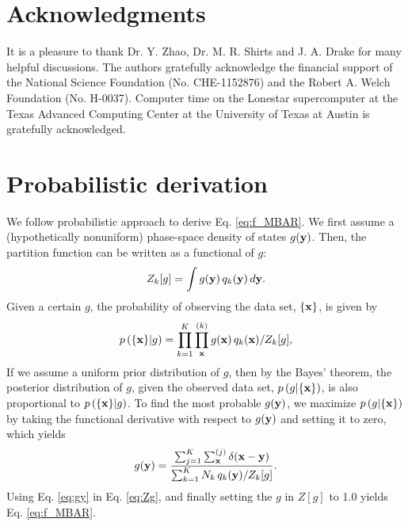 \documentclass[reprint,aip,jcp,superscriptaddress]{revtex4-1}
\begin{document}
\section{Acknowledgments}





It is a pleasure to thank
Dr. Y. Zhao, Dr. M. R. Shirts and J. A. Drake
for many helpful discussions.
%
The authors gratefully acknowledge
the financial support of
the National Science Foundation (No. CHE-1152876)
and
the Robert A. Welch Foundation (No. H-0037).
%
Computer time on the Lonestar supercomputer
at the Texas Advanced Computing Center
at the University of Texas at Austin
is gratefully acknowledged.




\appendix





\section{\label{sec:deriveMBAR}
Probabilistic derivation}



We follow probabilistic approach\cite{
bartels1997, *habeck2007, *habeck2012} to derive
Eq. \eqref{eq:f_MBAR}.
%
We first assume
a (hypothetically nonuniform)
phase-space density of states
$g(\mathbf{y})$.
%
Then, the partition function can be written
as a functional of $g$:
%
\begin{equation}
Z_k[g]
=
\int g(\mathbf{y}) \, q_k(\mathbf{y}) \, d\mathbf{y}.
\label{eq:Zg}
\end{equation}
%
Given a certain $g$,
the probability of observing the data set,
$\{ \mathbf{x} \}$,
is given by
%
\begin{equation*}
p\left( \{ \mathbf{x} \} | g \right)
=
\prod_{k = 1}^K
\prod_{\mathbf{x}}^{(k)}
g(\mathbf{x}) \, q_k(\mathbf{x}) / Z_k[g],
\end{equation*}
%
If we assume a uniform prior distribution of $g$,
then by the Bayes' theorem\cite{leonard},
the posterior distribution of $g$,
given the observed data set,
$p\left( g | \{ \mathbf{x} \} \right)$,
is also proportional to
$p\left( \{ \mathbf{x} \} | g \right)$.
%
To find the most probable $g(\mathbf{y})$,
we maximize
$p\left( g | \{ \mathbf{x} \} \right)$
by taking the functional derivative
with respect to $g(\mathbf{y})$
and setting it to zero,
which yields
%
\begin{equation}
g(\mathbf{y})
=
\frac{
  \sum_{j = 1}^K \sum_{\mathbf{x}}^{(j)} \delta(\mathbf{x} - \mathbf{y})
}
{
  \sum_{k = 1}^K N_k \, q_k(\mathbf{y}) / Z_k[g]
}.
\label{eq:gy}
\end{equation}
%
Using Eq. \eqref{eq:gy}
in Eq. \eqref{eq:Zg},
and finally setting the $g$ in $Z[g]$ to 1.0
yields Eq. \eqref{eq:f_MBAR}.
\end{document}
